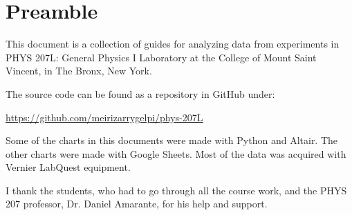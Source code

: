 \chapter*{Preamble}
This document is a collection of guides for analyzing data from experiments in PHYS 207L: General Physics I Laboratory at the College of Mount Saint Vincent, in The Bronx, New York.

The source code can be found as a repository in GitHub under:
\begin{center}
    \url{https://github.com/meirizarrygelpi/phys-207L}
\end{center}
Some of the charts in this documents were made with Python and Altair. The other charts were made with Google Sheets. Most of the data was acquired with Vernier LabQuest equipment.

I thank the students, who had to go through all the course work, and the PHYS 207 professor, Dr. Daniel Amarante, for his help and support.